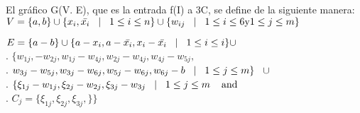 El gráfico G(V. E), que es la entrada f(I) a 3C, se define de la siguiente manera:\\ 

$ V = \{ a,b \} \cup \{ x_{i}, \bar{x_{i}} \hspace{3mm} | \hspace{3mm} 1 \leq i \leq n \}  \cup \{ w_{ij} \hspace{3mm} | \hspace{3mm} 1 \leq i \leq 6 \text{y} 1 \leq j \leq m \}$

$ E = \{a - b\} \cup \{a - x_{i}, a - \bar{x_{i}}, x_{i} - \bar{x_{i}} \hspace{3mm} | \hspace{3mm} 1 \leq i \leq i \} \cup$\\
\textcolor{AzulRey}{.} \hspace{12mm} $\{w_{1j}, - w_{2j}, w_{1j} - w_{4j}, w_{2j} - w_{4j}, w_{4j} - w_{5j}, $ \\
\textcolor{AzulRey}{.} \hspace{12mm} $ w_{3j} - w_{5j}, w_{3j} - w_{6j}, w_{5j} - w_{6j}, w_{6j} - b \hspace{3mm} | \hspace{3mm} 1 \leq j \leq m \}  \hspace{3mm} \cup $ \\ 
\textcolor{AzulRey}{.} \hspace{12mm} $\{ \xi_{1j} -  w_{1j},  \xi_{2j} - w_{2j}, \xi_{3j} -  w_{3j}  \hspace{3mm} | \hspace{3mm} 1 \leq j \leq m  \hspace{4mm} \text{and} $ \\ 
\textcolor{AzulRey}{.} \hspace{12mm} $C_{j} = \{ \xi_{1j},  \xi_{2j},  \xi_{3j}, \}\} $\\ 


